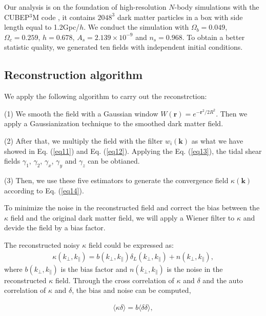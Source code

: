 \documentclass[aps,prd,twocolumn,showpacs,superscriptaddress,groupedaddress,nofootinbib]{revtex4}  %
\begin{document}
Our analysis is on the foundation of high-resolution $N$-body simulations with the CUBEP$^3$M code \cite{2013MNRAS.436..540H}, it contains $2048^3$ dark matter particles in a box with side length equal to 1.2Gpc/$h$. We conduct the simulation with $\Omega_{b}=0.049$, $\Omega_{c}=0.259$, $h=0.678$, $A_{s}=2.139\times10^{-9}$ and $n_{s}=0.968$. To obtain a better statistic quality, we generated ten fields with independent initial conditions.

\subsection{Reconstruction algorithm}

We apply the following algorithm to carry out the reconstrction:

(1) We smooth the field with a Gaussian window $W(\bm{r}) = e^{-\bm{r}^2/2R^2}$. Then we apply a Gaussianization technique to the smoothed dark matter field. 

(2) After that, we multiply the field with the filter $w_{i}(\bm{k})$ as what we have showed in Eq. (\ref{eq11}) and Eq. (\ref{eq12}). Applying the Eq. (\ref{eq13}), the tidal shear fields $\gamma_{1}$, $\gamma_{2}$, $\gamma_{x}$, $\gamma_{y}$ and $\gamma_{z}$ can be obtianed.

(3) Then, we use these five estimators to generate the convergence field $\kappa(\bm{k})$ according to Eq. (\ref{eq14}). 

To minimize the noise in the reconstructed field and correct the bias between the $\kappa$ field and the original dark matter field, we will apply a Wiener filter to $\kappa$ and devide the field by a bias factor.

The reconstructed noisy $\kappa$ field could be expressed as:
\begin{eqnarray}
\kappa(k_\perp, k_\parallel) = b(k_\perp, k_\parallel)
\delta_L(k_\perp, k_\parallel) + n(k_\perp, k_\parallel),
\label{eq17}
\end{eqnarray}
where $b(k_\perp, k_\parallel)$ is the bias factor and $n(k_\perp,k_\parallel)$
is the noise in the reconstructed $\kappa$ field.
Through the cross correlation of $\kappa$ and $\delta$ and the auto correlation of $\kappa$ and $\delta$, the bias and noise can be computed,

\begin{eqnarray}
\langle\kappa\delta\rangle = b\langle\delta\delta\rangle,
\label{eq18}
\end{eqnarray}
\end{document}
